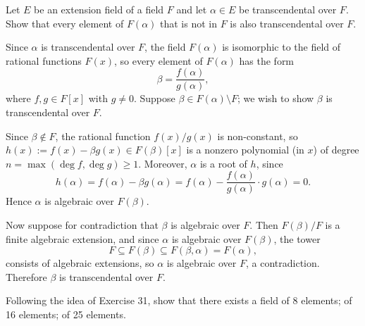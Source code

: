 
\begin{problem}[39.33]
  Let $E$ be an extension field of a field $F$ and let $\alpha \in E$ be transcendental over $F$. Show that every element of $F(\alpha)$ that is not in $F$ is also transcendental over $F$.
\end{problem}

\begin{solution}
  Since $\alpha$ is transcendental over $F$, the field $F(\alpha)$ is isomorphic to the field of rational functions $F(x)$, so every element of $F(\alpha)$ has the form
  \[%
    \beta = \frac{f(\alpha)}{g(\alpha)}
  ,\]%
  where $f, g \in F[x]$ with $g \neq 0$. Suppose $\beta \in F(\alpha) \setminus F$; we wish to show $\beta$ is transcendental over $F$.

  Since $\beta \notin F$, the rational function $f(x)/g(x)$ is non-constant, so $h(x) := f(x) - \beta g(x) \in F(\beta)[x]$ is a nonzero polynomial (in $x$) of degree $n = \max(\deg f, \deg g) \geq 1$. Moreover, $\alpha$ is a root of $h$, since
  \[%
    h(\alpha) = f(\alpha) - \beta g(\alpha) = f(\alpha) - \frac{f(\alpha)}{g(\alpha)} \cdot g(\alpha) = 0
  .\]%
  Hence $\alpha$ is algebraic over $F(\beta)$.

  Now suppose for contradiction that $\beta$ is algebraic over $F$. Then $F(\beta)/F$ is a finite algebraic extension, and since $\alpha$ is algebraic over $F(\beta)$, the tower
  \[%
    F \subseteq F(\beta) \subseteq F(\beta, \alpha) = F(\alpha)
  ,\]%
  consists of algebraic extensions, so $\alpha$ is algebraic over $F$, a contradiction. Therefore $\beta$ is transcendental over $F$.
\end{solution}

\begin{problem}[39.35]
  Following the idea of Exercise 31, show that there exists a field of 8 elements; of 16 elements; of 25 elements.
\end{problem}

